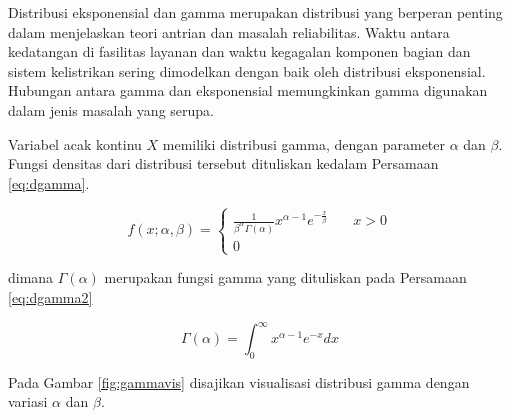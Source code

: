 \documentclass[]{book}
\begin{document}
Distribusi eksponensial dan gamma merupakan distribusi yang berperan
penting dalam menjelaskan teori antrian dan masalah reliabilitas. Waktu
antara kedatangan di fasilitas layanan dan waktu kegagalan komponen
bagian dan sistem kelistrikan sering dimodelkan dengan baik oleh
distribusi eksponensial. Hubungan antara gamma dan eksponensial
memungkinkan gamma digunakan dalam jenis masalah yang serupa.

Variabel acak kontinu \(X\) memiliki distribusi gamma, dengan parameter
\(\alpha\) dan \(\beta\). Fungsi densitas dari distribusi tersebut
dituliskan kedalam Persamaan \eqref{eq:dgamma}.

\begin{equation}
f\left(x;\alpha ,\beta \right) =
  \begin{cases}
    \frac{1}{\beta^{\alpha}\Gamma\left(\alpha\right)}x^{\alpha-1}e^{-\frac{x}{\beta}}       & \quad x>0\\
    0                   & \quad\text{}
    \end{cases}
 \label{eq:dgamma}
\end{equation}

dimana \(\Gamma\left(\alpha\right)\) merupakan fungsi gamma yang
dituliskan pada Persamaan \eqref{eq:dgamma2}

\begin{equation}
   \Gamma\left(\alpha\right)=\int_0^{\infty}x^{\alpha-1}e^{-x}dx
  \label{eq:dgamma2}
\end{equation}

Pada Gambar \ref{fig:gammavis} disajikan visualisasi distribusi gamma
dengan variasi \(\alpha\) dan \(\beta\).
\end{document}
